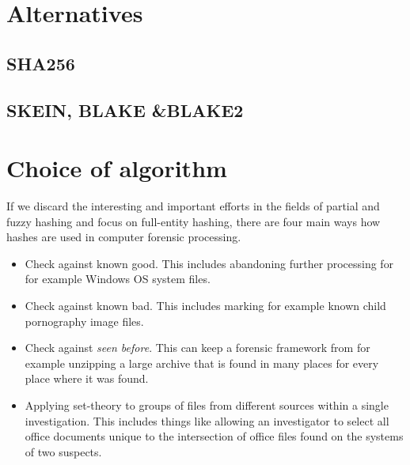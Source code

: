 \section{Alternatives}
\subsection{SHA256}

\subsection{SKEIN, BLAKE \&BLAKE2}

\section{Choice of algorithm}
If we discard the interesting and important efforts in the fields of partial and fuzzy hashing and focus on full-entity hashing, there are four main ways how hashes are used in computer forensic processing.
\begin{itemize}
\item Check against known good. This includes abandoning further processing for for example Windows OS system files.
\item Check against known bad. This includes marking for example known child pornography image files.
\item Check against \emph{seen before}. This can keep a forensic framework from for example unzipping a large archive that is found in many places for every place where it was found.
\item Applying set-theory to groups of files from different sources within a single investigation. This includes things like allowing an investigator to select all office documents unique to the intersection of office files found on the systems of two suspects.
\end{itemize}
